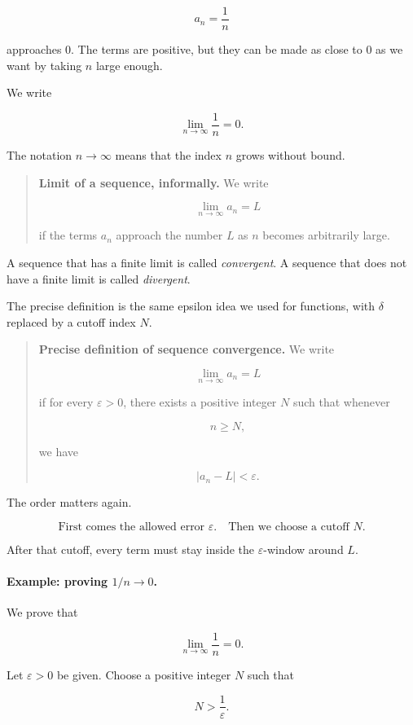 \[
a_n=\frac1n
\]

approaches \(0\).  The terms are positive, but they can be made as close to \(0\) as we want by taking \(n\) large enough.

We write

\[
\lim_{n\to\infty}\frac1n=0.
\]

The notation \(n\to\infty\) means that the index \(n\) grows without bound.

\begin{quote}
\textbf{Limit of a sequence, informally.}
We write

\[
\lim_{n\to\infty}a_n=L
\]

if the terms \(a_n\) approach the number \(L\) as \(n\) becomes arbitrarily large.
\end{quote}

A sequence that has a finite limit is called \emph{convergent}.  A sequence that does not have a finite limit is called \emph{divergent}.

The precise definition is the same epsilon idea we used for functions, with \(\delta\) replaced by a cutoff index \(N\).

\begin{quote}
\textbf{Precise definition of sequence convergence.}
We write

\[
\lim_{n\to\infty}a_n=L
\]

if for every \(\varepsilon>0\), there exists a positive integer \(N\) such that whenever

\[
n\ge N,
\]

we have

\[
|a_n-L|<\varepsilon.
\]
\end{quote}

The order matters again.

\[
\boxed{
\text{First comes the allowed error }\varepsilon.
\quad
\text{Then we choose a cutoff }N.
}
\]

After that cutoff, every term must stay inside the \(\varepsilon\)-window around \(L\).

\paragraph{Example: proving \(1/n\to0\).}
We prove that

\[
\lim_{n\to\infty}\frac1n=0.
\]

Let \(\varepsilon>0\) be given.  Choose a positive integer \(N\) such that

\[
N>\frac1{\varepsilon}.
\]

